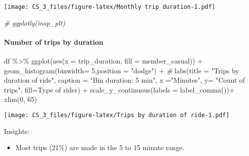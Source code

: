 \documentclass[
]{article}
\newenvironment{Shaded}{\begin{snugshade}}{\end{snugshade}}
\newcommand{\AttributeTok}[1]{\textcolor[rgb]{0.77,0.63,0.00}{#1}}
\newcommand{\CommentTok}[1]{\textcolor[rgb]{0.56,0.35,0.01}{\textit{#1}}}
\newcommand{\DecValTok}[1]{\textcolor[rgb]{0.00,0.00,0.81}{#1}}
\newcommand{\FunctionTok}[1]{\textcolor[rgb]{0.00,0.00,0.00}{#1}}
\newcommand{\NormalTok}[1]{#1}
\newcommand{\SpecialCharTok}[1]{\textcolor[rgb]{0.00,0.00,0.00}{#1}}
\newcommand{\StringTok}[1]{\textcolor[rgb]{0.31,0.60,0.02}{#1}}
\providecommand{\tightlist}{%
  \setlength{\itemsep}{0pt}\setlength{\parskip}{0pt}}
\begin{document}
\texttt{[image: CS\_3\_files/figure-latex/Monthly trip duration-1.pdf]}

\begin{Shaded}
\begin{Highlighting}[]
\CommentTok{\# ggplotly(insp\_plt)}
\end{Highlighting}
\end{Shaded}

\hypertarget{number-of-trips-by-duration}{%
\paragraph{Number of trips by
duration}\label{number-of-trips-by-duration}}

\begin{Shaded}
\begin{Highlighting}[]
\NormalTok{df }\SpecialCharTok{\%\textgreater{}\%} 
  \FunctionTok{ggplot}\NormalTok{(}\FunctionTok{aes}\NormalTok{(}\AttributeTok{x =}\NormalTok{ trip\_duration, }\AttributeTok{fill =}\NormalTok{ member\_casual)) }\SpecialCharTok{+}
  \FunctionTok{geom\_histogram}\NormalTok{(}\AttributeTok{binwidth=} \DecValTok{5}\NormalTok{,}\AttributeTok{position =} \StringTok{"dodge"}\NormalTok{) }\SpecialCharTok{+} \CommentTok{\#}
  \FunctionTok{labs}\NormalTok{(}\AttributeTok{title =} \StringTok{"Trips by duration of ride"}\NormalTok{,}
       \AttributeTok{caption =} \StringTok{"Bin duration: 5 min"}\NormalTok{,}
       \AttributeTok{x =}\StringTok{"Minutes"}\NormalTok{, }\AttributeTok{y=} \StringTok{"Count of trips"}\NormalTok{,}
       \AttributeTok{fill=}\StringTok{\textquotesingle{}Type of rider\textquotesingle{}}\NormalTok{) }\SpecialCharTok{+}
  \FunctionTok{scale\_y\_continuous}\NormalTok{(}\AttributeTok{labels =} \FunctionTok{label\_comma}\NormalTok{())}\SpecialCharTok{+}
  \FunctionTok{xlim}\NormalTok{(}\DecValTok{0}\NormalTok{, }\DecValTok{65}\NormalTok{)}
\end{Highlighting}
\end{Shaded}

\texttt{[image: CS\_3\_files/figure-latex/Trips by duration of ride-1.pdf]}

Insights:

\begin{itemize}
\tightlist
\item
  Most trips (21\%) are made in the 5 to 15 minute range.
\end{itemize}
\end{document}
